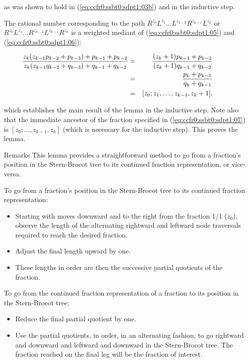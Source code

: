 \begin{vworklemmaproof}
\noindent{}as was shown to hold in (\ref{eq:ccfr0:ssbt0:sdpt1:03b}) and
in the inductive step.

The rational number corresponding to the path
$R^{z_0}L^{z_1} \ldots{} L^{z_{k-2}} R^{z_{k-1}} L^{z_{k}}$ 
or $R^{z_0}L^{z_1} \ldots{} R^{z_{k-2}} L^{z_{k-1}} R^{z_{k}}$
is a weighted mediant of (\ref{eq:ccfr0:ssbt0:sdpt1:05}) 
and (\ref{eq:ccfr0:ssbt0:sdpt1:06}):

\begin{eqnarray}
\label{eq:ccfr0:ssbt0:sdpt1:07}
\hspace{-0.35in}
\frac{z_k(z_{k-1}p_{k-2} + p_{k-3}) + p_{k-1} + p_{k-2}}
     {z_k(z_{k-1}q_{k-2} + q_{k-3}) + q_{k-1} + q_{k-2}}
 & = &
\frac{(z_k + 1)p_{k-1} + p_{k-2}}{(z_k + 1)q_{k-1} + q_{k-2}} \\
\label{eq:ccfr0:ssbt0:sdpt1:08}
& = & \frac{p_k + p_{k-1}}{q_k + q_{k-1}} \\
& = & [z_0; z_1, \ldots{}, z_{k-1}, z_{k} + 1],
\end{eqnarray}

\noindent{}which establishes the main result of the lemma in the
inductive step.  Note also that the immediate ancestor of the
fraction specified in (\ref{eq:ccfr0:ssbt0:sdpt1:07}) is 
$[z_0; \ldots{}, z_{k-1}, z_{k}]$ (which is necessary for 
the inductive step).  This proves the lemma.
\end{vworklemmaproof}
\begin{vworklemmaparsection}{Remarks}
This lemma provides a straightforward method to go from a
fraction's position in the Stern-Brocot tree to its continued
fraction representation, or vice-versa.

To go from a fraction's position in the Stern-Brocot tree to its
continued fraction representation:

\begin{itemize}
\item Starting with moves downward and to the right from the
      fraction 1/1 ($z_0$), observe the length of the alternating
      rightward and leftward node traversals required to reach
	  the desired fraction.

\item Adjust the final length upward by one.

\item These lengths in order are then the successive partial quotients
      of the fraction.
\end{itemize}

To go from the continued fraction representation of a fraction
to its position in the Stern-Brocot tree:

\begin{itemize}
\item Reduce the final partial quotient by one.

\item Use the partial quotients, in order, in an alternating fashion,
      to go rightward and downward
      and leftward and downward in the Stern-Brocot tree.  The fraction
	  reached on the final leg will be the fraction of interest.
\end{itemize}
\end{vworklemmaparsection}
\vworklemmafooter{}

